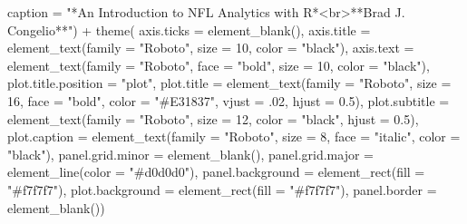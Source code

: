 \documentclass[
  letterpaper,
]{krantz}
\newenvironment{Shaded}{\begin{snugshade}}{\end{snugshade}}
\newcommand{\AttributeTok}[1]{\textcolor[rgb]{0.40,0.45,0.13}{#1}}
\newcommand{\DecValTok}[1]{\textcolor[rgb]{0.68,0.00,0.00}{#1}}
\newcommand{\FloatTok}[1]{\textcolor[rgb]{0.68,0.00,0.00}{#1}}
\newcommand{\FunctionTok}[1]{\textcolor[rgb]{0.28,0.35,0.67}{#1}}
\newcommand{\NormalTok}[1]{\textcolor[rgb]{0.00,0.23,0.31}{#1}}
\newcommand{\SpecialCharTok}[1]{\textcolor[rgb]{0.37,0.37,0.37}{#1}}
\newcommand{\StringTok}[1]{\textcolor[rgb]{0.13,0.47,0.30}{#1}}
\begin{document}
\begin{Shaded}
\begin{Highlighting}[]
       \AttributeTok{caption =} \StringTok{"*An Introduction to NFL Analytics with R*\textless{}br\textgreater{}**Brad J. Congelio**"}\NormalTok{) }\SpecialCharTok{+}
  \FunctionTok{theme}\NormalTok{(}
    \AttributeTok{axis.ticks =} \FunctionTok{element\_blank}\NormalTok{(),}
    \AttributeTok{axis.title =} \FunctionTok{element\_text}\NormalTok{(}\AttributeTok{family =} \StringTok{"Roboto"}\NormalTok{,}
                              \AttributeTok{size =} \DecValTok{10}\NormalTok{, }
                              \AttributeTok{color =} \StringTok{"black"}\NormalTok{),}
    \AttributeTok{axis.text =} \FunctionTok{element\_text}\NormalTok{(}\AttributeTok{family =} \StringTok{"Roboto"}\NormalTok{,}
                             \AttributeTok{face =} \StringTok{"bold"}\NormalTok{,}
                             \AttributeTok{size =} \DecValTok{10}\NormalTok{,}
                             \AttributeTok{color =} \StringTok{"black"}\NormalTok{),}
    \AttributeTok{plot.title.position =} \StringTok{"plot"}\NormalTok{,}
    \AttributeTok{plot.title =} \FunctionTok{element\_text}\NormalTok{(}\AttributeTok{family =} \StringTok{"Roboto"}\NormalTok{,}
                              \AttributeTok{size =} \DecValTok{16}\NormalTok{,}
                              \AttributeTok{face =} \StringTok{"bold"}\NormalTok{,}
                              \AttributeTok{color =} \StringTok{"\#E31837"}\NormalTok{,}
                              \AttributeTok{vjust =}\NormalTok{ .}\DecValTok{02}\NormalTok{,}
                              \AttributeTok{hjust =} \FloatTok{0.5}\NormalTok{),}
    \AttributeTok{plot.subtitle =} \FunctionTok{element\_text}\NormalTok{(}\AttributeTok{family =} \StringTok{"Roboto"}\NormalTok{,}
                                 \AttributeTok{size =} \DecValTok{12}\NormalTok{,}
                                 \AttributeTok{color =} \StringTok{"black"}\NormalTok{,}
                                 \AttributeTok{hjust =} \FloatTok{0.5}\NormalTok{),}
    \AttributeTok{plot.caption =} \FunctionTok{element\_text}\NormalTok{(}\AttributeTok{family =} \StringTok{"Roboto"}\NormalTok{,}
                                \AttributeTok{size =} \DecValTok{8}\NormalTok{,}
                                \AttributeTok{face =} \StringTok{"italic"}\NormalTok{,}
                                \AttributeTok{color =} \StringTok{"black"}\NormalTok{),}
    \AttributeTok{panel.grid.minor =} \FunctionTok{element\_blank}\NormalTok{(),}
    \AttributeTok{panel.grid.major =}  \FunctionTok{element\_line}\NormalTok{(}\AttributeTok{color =} \StringTok{"\#d0d0d0"}\NormalTok{),}
    \AttributeTok{panel.background =} \FunctionTok{element\_rect}\NormalTok{(}\AttributeTok{fill =} \StringTok{"\#f7f7f7"}\NormalTok{),}
    \AttributeTok{plot.background =} \FunctionTok{element\_rect}\NormalTok{(}\AttributeTok{fill =} \StringTok{"\#f7f7f7"}\NormalTok{),}
    \AttributeTok{panel.border =} \FunctionTok{element\_blank}\NormalTok{())}
\end{Highlighting}
\end{Shaded}
\end{document}

